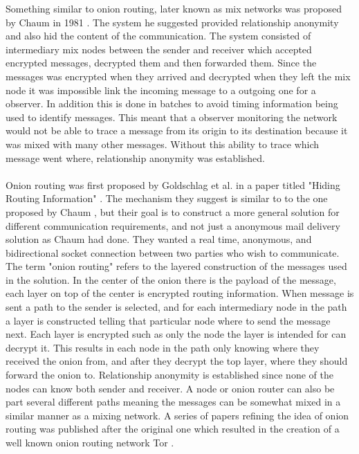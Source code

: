 \documentclass[informationsecurity]{gucmasterproject}
\begin{document}
Something similar to onion routing, later known as mix networks was proposed by Chaum in 1981 \cite{chaum1981untraceable}.
The system he suggested provided relationship anonymity and also hid the content of the communication. The system consisted of intermediary mix nodes between the sender and receiver which accepted encrypted messages, decrypted them and then forwarded them. Since the messages was encrypted when they arrived and decrypted when they left the mix node it was impossible link the incoming message to a outgoing one for a observer. In addition this is done in batches to avoid timing information being used to identify messages. This meant that a observer monitoring the network would not be able to trace a message from its origin to its destination because it was mixed with many other messages. Without this ability to trace which message went where, relationship anonymity was established.

\paragraph{}
Onion routing was first proposed by Goldschlag et al. in a paper titled "Hiding Routing Information" \cite{goldschlag1996hiding}.
The mechanism they suggest is similar to to the one proposed by Chaum \cite{chaum1981untraceable}, but their goal is to construct a more general solution for different communication requirements, and not just a anonymous mail delivery solution as Chaum had done. They wanted a real time, anonymous, and bidirectional socket connection between two parties who wish to communicate. The term "onion routing" refers to the layered construction of the messages used in the solution. In the center of the onion there is the payload of the message, each layer on top of the center is encrypted routing information. When message is sent a path to the sender is selected, and for each intermediary node in the path a layer is constructed telling that particular node where to send the message next. Each layer is encrypted such as only the node the layer is intended for can decrypt it. This results in each node in the path only knowing where they received the onion from, and after they decrypt the top layer, where they should forward the onion to. Relationship anonymity is established since none of the nodes can know both sender and receiver. A node or onion router can also be part several different paths meaning the messages can be somewhat mixed in a similar manner as a mixing network.
A series of papers refining the idea of onion routing was published after the original one which resulted in the creation of a well known onion routing network Tor \cite{reed1998anonymous}\cite{goldschlag1999onion}\cite{dingledine2004tor}.
\end{document}
